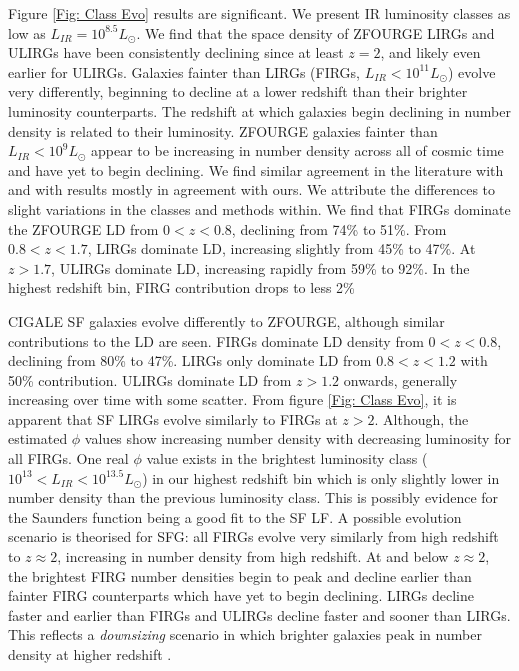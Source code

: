 Figure \ref{Fig: Class Evo} results are significant. We present IR luminosity classes as low as $L_{IR}=10^{8.5} L_{\odot}$. We find that the space density of ZFOURGE LIRGs and ULIRGs have been consistently declining since at least $z=2$, and likely even earlier for ULIRGs. Galaxies fainter than LIRGs (FIRGs, $L_{IR} < 10^{11} L_{\odot}$) evolve very differently, beginning to decline at a lower redshift than their brighter luminosity counterparts. The redshift at which galaxies begin declining in number density is related to their luminosity. ZFOURGE galaxies fainter than $L_{IR} < 10^{9} L_{\odot}$ appear to be increasing in number density across all of cosmic time and have yet to begin declining. We find similar agreement in the literature with \cite{rodighiero_mid-_2010} and \cite{gruppioni_herschel_2013} with results mostly in agreement with ours. We attribute the differences to slight variations in the classes and methods within. We find that FIRGs dominate the ZFOURGE LD from $0<z<0.8$, declining from 74\% to 51\%. From $0.8<z<1.7$, LIRGs dominate LD, increasing slightly from 45\% to 47\%. At $z>1.7$, ULIRGs dominate LD, increasing rapidly from 59\% to 92\%. In the highest redshift bin, FIRG contribution drops to less 2\%

CIGALE SF galaxies evolve differently to ZFOURGE, although similar contributions to the LD are seen. FIRGs dominate LD density from $0<z<0.8$, declining from 80\% to 47\%. LIRGs only dominate LD from $0.8<z<1.2$ with 50\% contribution. ULIRGs dominate LD from $z>1.2$ onwards, generally increasing over time with some scatter. From figure \ref{Fig: Class Evo}, it is apparent that SF LIRGs evolve similarly to FIRGs at $z>2$. Although, the estimated $\phi$ values show increasing number density with decreasing luminosity for all FIRGs. One real $\phi$ value exists in the brightest luminosity class ($10^{13} < L_{IR} < 10^{13.5} L_{\odot}$) in our highest redshift bin which is only slightly lower in number density than the previous luminosity class. This is possibly evidence for the Saunders function being a good fit to the SF LF. A possible evolution scenario is theorised for SFG: all FIRGs evolve very similarly from high redshift to $z \approx 2$, increasing in number density from high redshift. At and below $z \approx 2$, the brightest FIRG number densities begin to peak and decline earlier than fainter FIRG counterparts which have yet to begin declining. LIRGs decline faster and earlier than FIRGs and ULIRGs decline faster and sooner than LIRGs. This reflects a \textit{downsizing} scenario in which brighter galaxies peak in number density at higher redshift \citep{merloni_synthesis_2008, wylezalek_galaxy_2014, fiore_agn_2017}.

